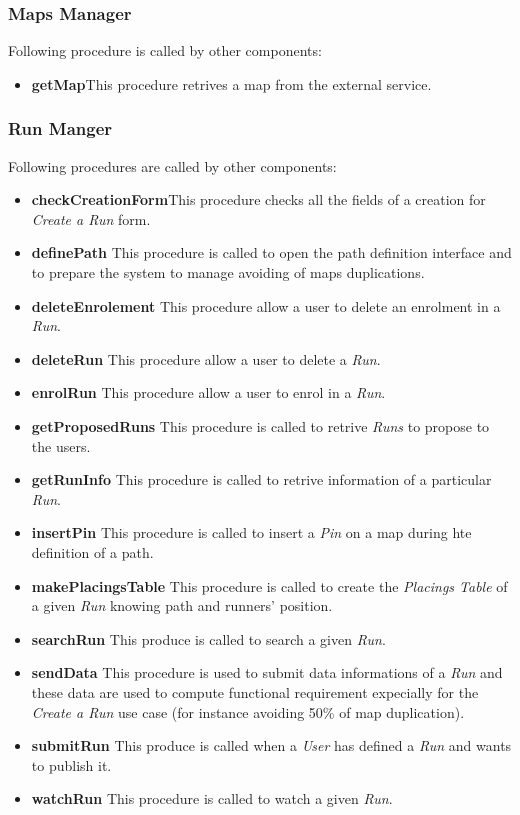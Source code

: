 \subsubsection{Maps Manager}
Following procedure is called by other components:
\begin{itemize}
  \item \textbf{getMap}\quad This procedure retrives a map from the external service.
\end{itemize}

\subsubsection{Run Manger}
Following procedures are called by other components:
\begin{itemize}
  \item \textbf{checkCreationForm}\quad This procedure checks all the fields of a creation for \textit{Create a Run} form.
  \item \textbf{definePath} \quad This procedure is called to open the path definition interface and to prepare the system to manage avoiding of maps duplications.
  \item \textbf{deleteEnrolement} \quad This procedure allow a user to delete an enrolment in a \textit{Run}.
  \item \textbf{deleteRun} \quad This procedure allow a user to delete a \textit{Run}.
  \item \textbf{enrolRun} \quad This procedure allow a user to enrol in a \textit{Run}.
  \item \textbf{getProposedRuns} \quad This procedure is called to retrive \textit{Runs} to propose to the users.
  \item \textbf{getRunInfo} \quad This procedure is called to retrive information of a particular \textit{Run}.
  \item \textbf{insertPin} \quad This procedure is called to insert a \textit{Pin} on a map during hte definition of a path.
  \item \textbf{makePlacingsTable} \quad This procedure is called to create the \textit{Placings Table} of a given \textit{Run} knowing path and runners' position.
  \item \textbf{searchRun} \quad This produce is called to search a given \textit{Run}.
  \item \textbf{sendData} \quad This procedure is used to submit data informations of a \textit{Run} and these data are used to compute functional requirement expecially for the \textit{Create a Run} use case (for instance avoiding 50\% of map duplication).
  \item \textbf{submitRun} \quad This produce is called when a \textit{User} has defined a \textit{Run} and wants to publish it.
  \item \textbf{watchRun} \quad This procedure is called to watch a given \textit{Run}.
\end{itemize}

